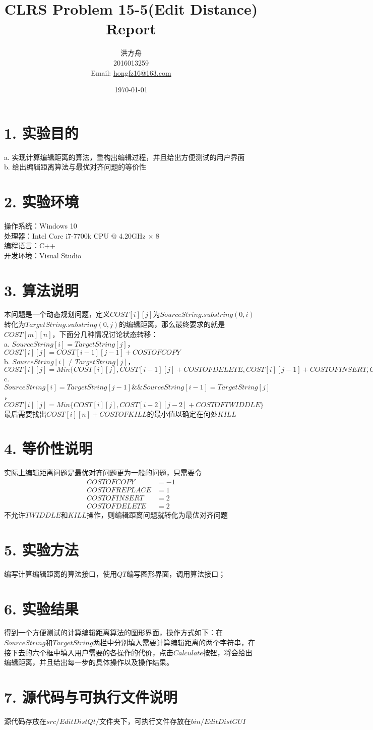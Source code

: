 \documentclass{article}
\title{CLRS Problem 15-5(Edit Distance) Report}
\author{洪方舟\\2016013259\\Email: \href{mailto:hongfz16@163.com}{hongfz16@163.com}}
\date{\today}
\begin{document}
  \maketitle
  \setlength\parindent{0em}
  \section*{1. 实验目的}
  a. 实现计算编辑距离的算法，重构出编辑过程，并且给出方便测试的用户界面\\
  b. 给出编辑距离算法与最优对齐问题的等价性
  \section*{2. 实验环境}
  操作系统：Windows 10\\
  处理器：Intel Core i7-7700k CPU @ 4.20GHz $\times$ 8\\
  编程语言：C++\\
  开发环境：Visual Studio
  \section*{3. 算法说明}
  本问题是一个动态规划问题，定义$COST[i][j]$为$SourceString.substring(0,i)$转化为$TargetString.substring(0,j)$的编辑距离，那么最终要求的就是$COST[m][n]$，下面分几种情况讨论状态转移：\\
  a. $SourceString[i] = TargetString[j]$，$COST[i][j]=COST[i-1][j-1]+COSTOFCOPY$\\
  b. $SourceString[i] \neq TargetString[j]$，$COST[i][j]=Min\{COST[i][j], COST[i-1][j]+COSTOFDELETE, COST[i][j-1]+COSTOFINSERT, COST[i-1][j-1]+COSTOFREPLACE\}$\\
  c. $SourceString[i]=TargetString[j-1] \&\& SourceString[i-1]=TargetString[j]$，$COST[i][j]=Min\{COST[i][j], COST[i-2][j-2]+COSTOFTWIDDLE\}$\\
  最后需要找出$COST[i][n]+COSTOFKILL$的最小值以确定在何处$KILL$
  \section*{4. 等价性说明}
  实际上编辑距离问题是最优对齐问题更为一般的问题，只需要令
  \begin{align*}
    COSTOFCOPY &= -1 \\
    COSTOFREPLACE &= 1 \\
    COSTOFINSERT &= 2 \\
    COSTOFDELETE &= 2
  \end{align*}
  不允许$TWIDDLE$和$KILL$操作，则编辑距离问题就转化为最优对齐问题
  \section*{5. 实验方法}
  编写计算编辑距离的算法接口，使用$QT$编写图形界面，调用算法接口；
  \section*{6. 实验结果}
  得到一个方便测试的计算编辑距离算法的图形界面，操作方式如下：在$Source String$和$Target String$两栏中分别填入需要计算编辑距离的两个字符串，在接下去的六个框中填入用户需要的各操作的代价，点击$Calculate$按钮，将会给出编辑距离，并且给出每一步的具体操作以及操作结果。
  \section*{7. 源代码与可执行文件说明}
  源代码存放在$src/EditDistQt/$文件夹下，可执行文件存放在$bin/EditDistGUI$
\end{document}
